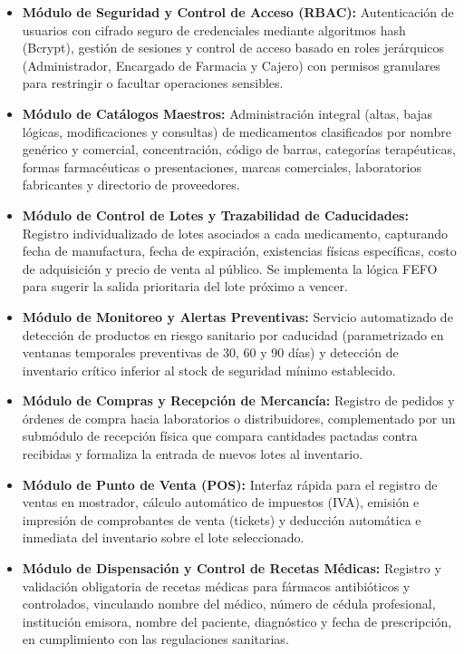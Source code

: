 \begin{itemize}
    \item \textbf{Módulo de Seguridad y Control de Acceso (RBAC):} Autenticación de usuarios con cifrado seguro de credenciales mediante algoritmos hash (Bcrypt), gestión de sesiones y control de acceso basado en roles jerárquicos (Administrador, Encargado de Farmacia y Cajero) con permisos granulares para restringir o facultar operaciones sensibles.
    \item \textbf{Módulo de Catálogos Maestros:} Administración integral (altas, bajas lógicas, modificaciones y consultas) de medicamentos clasificados por nombre genérico y comercial, concentración, código de barras, categorías terapéuticas, formas farmacéuticas o presentaciones, marcas comerciales, laboratorios fabricantes y directorio de proveedores.
    \item \textbf{Módulo de Control de Lotes y Trazabilidad de Caducidades:} Registro individualizado de lotes asociados a cada medicamento, capturando fecha de manufactura, fecha de expiración, existencias físicas específicas, costo de adquisición y precio de venta al público. Se implementa la lógica FEFO para sugerir la salida prioritaria del lote próximo a vencer.
    \item \textbf{Módulo de Monitoreo y Alertas Preventivas:} Servicio automatizado de detección de productos en riesgo sanitario por caducidad (parametrizado en ventanas temporales preventivas de 30, 60 y 90 días) y detección de inventario crítico inferior al stock de seguridad mínimo establecido.
    \item \textbf{Módulo de Compras y Recepción de Mercancía:} Registro de pedidos y órdenes de compra hacia laboratorios o distribuidores, complementado por un submódulo de recepción física que compara cantidades pactadas contra recibidas y formaliza la entrada de nuevos lotes al inventario.
    \item \textbf{Módulo de Punto de Venta (POS):} Interfaz rápida para el registro de ventas en mostrador, cálculo automático de impuestos (IVA), emisión e impresión de comprobantes de venta (tickets) y deducción automática e inmediata del inventario sobre el lote seleccionado.
    \item \textbf{Módulo de Dispensación y Control de Recetas Médicas:} Registro y validación obligatoria de recetas médicas para fármacos antibióticos y controlados, vinculando nombre del médico, número de cédula profesional, institución emisora, nombre del paciente, diagnóstico y fecha de prescripción, en cumplimiento con las regulaciones sanitarias.

\end{itemize}
